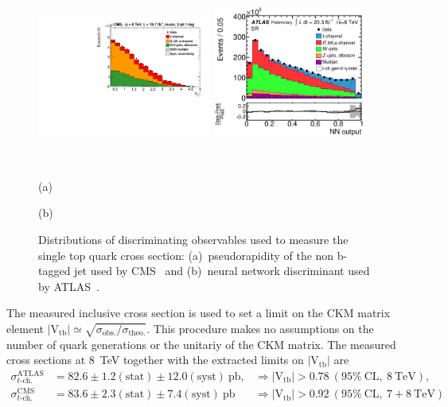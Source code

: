 \documentclass{PoS}
\begin{document}
\begin{figure}[htbp]
\begin{center}
\parbox{0.52\textwidth}{\centering\includegraphics[width=0.51\textwidth]{cms_xsec8/etamuon.pdf}}
\parbox{0.47\textwidth}{\centering\includegraphics[width=0.46\textwidth]{atlas_xsec8/nnoutput.pdf}}\\
\parbox{0.52\textwidth}{\centering (a)}
\parbox{0.47\textwidth}{\centering (b)}
\end{center}
\caption{\label{fig:fit-xsec-8}Distributions of discriminating observables used to measure the single top quark cross section: (a)~pseudorapidity of the non b-tagged jet used by CMS~\cite{cms-xsec8} and (b)~neural network discriminant used by ATLAS~\cite{atlas-xsec8}.}

\end{figure}

The measured inclusive cross section is used to set a limit on the CKM matrix element $|\mathrm{V_{tb}}|\simeq\sqrt{\sigma_\mathrm{obs.}/\sigma_\mathrm{theo.}}$. This procedure makes no assumptions on the number of quark generations or the unitariy of the CKM matrix. The measured cross sections at 8~TeV together with the extracted limits on $\mathrm{|V_{tb}|}$ are 
\begin{align}
\sigma_{t\mbox{-}\mathrm{ch.}}^\mathrm{ATLAS}&=82.6\pm1.2\mathrm{(stat)}\pm12.0\mathrm{(syst)}~\mathrm{pb}, &\Rightarrow |\mathrm{V_{tb}}|>0.78~\mathrm{(95\%~CL,~8~TeV)}, \\
\sigma_{t\mbox{-}\mathrm{ch.}}^\mathrm{CMS}&=83.6\pm2.3\mathrm{(stat)}\pm7.4\mathrm{(syst)}~\mathrm{pb} &\Rightarrow |\mathrm{V_{tb}}|>0.92~\mathrm{(95\%~CL,~7+8~TeV)}
\end{align}
\end{document}

